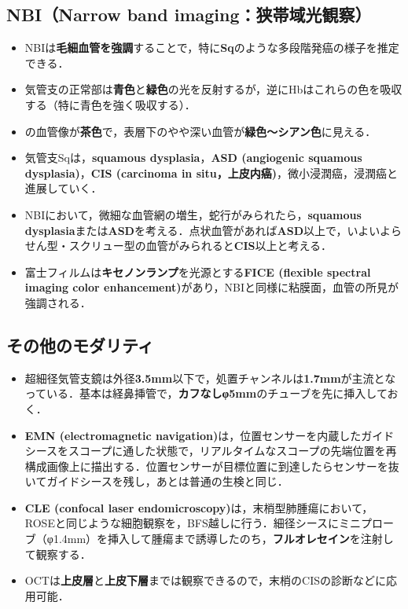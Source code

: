 \subsection{NBI（Narrow band imaging：狭帯域光観察）}
\begin{itemize}
\item NBIは\textbf{毛細血管を強調}することで，特に\textbf{Sq}のような多段階発癌の様子を推定できる．
\item 気管支の正常部は\textbf{青色}と\textbf{緑色}の光を反射するが，逆にHbはこれらの色を吸収する（特に青色を強く吸収する）．
\item {}の血管像が\textbf{茶色}で，表層下のやや深い血管が\textbf{緑色〜シアン色}に見える．
\item 気管支Sqは，\textbf{squamous dysplasia}，\textbf{ASD (angiogenic squamous dysplasia)}，\textbf{CIS (carcinoma in situ，上皮内癌)}，微小浸潤癌，浸潤癌と進展していく．
\item NBIにおいて，微細な血管網の増生，蛇行がみられたら，\textbf{squamous dysplasia}または\textbf{ASD}を考える．点状血管があれば\textbf{ASD}以上で，いよいよらせん型・スクリュー型の血管がみられると\textbf{CIS}以上と考える．
\item 富士フィルムは\textbf{キセノンランプ}を光源とする\textbf{FICE (flexible spectral imaging color enhancement)}があり，NBIと同様に粘膜面，血管の所見が強調される．


\end{itemize}

\subsection{その他のモダリティ}

\begin{itemize}

\item 超細径気管支鏡は外径\textbf{3.5mm}以下で，処置チャンネルは\textbf{1.7mm}が主流となっている．基本は経鼻挿管で，\textbf{カフなしφ5mm}のチューブを先に挿入しておく．

\item \textbf{EMN (electromagnetic navigation)}は，位置センサーを内蔵したガイドシースをスコープに通した状態で，リアルタイムなスコープの先端位置を再構成画像上に描出する．位置センサーが目標位置に到達したらセンサーを抜いてガイドシースを残し，あとは普通の生検と同じ．
\item \textbf{CLE (confocal laser endomicroscopy)}は，末梢型肺腫瘍において，ROSEと同じような細胞観察を，BFS越しに行う．細径シースにミニプローブ（φ1.4mm）を挿入して腫瘍まで誘導したのち，\textbf{フルオレセイン}を注射して観察する．
\item OCTは\textbf{上皮層}と\textbf{上皮下層}までは観察できるので，末梢のCISの診断などに応用可能．
\end{itemize}

